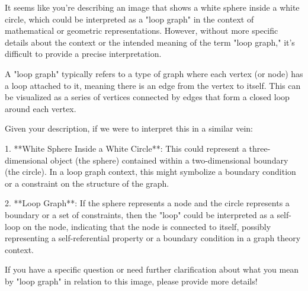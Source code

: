 It seems like you're describing an image that shows a white sphere inside a white circle, which could be interpreted as a "loop graph" in the context of mathematical or geometric representations. However, without more specific details about the context or the intended meaning of the term "loop graph," it's difficult to provide a precise interpretation.

A "loop graph" typically refers to a type of graph where each vertex (or node) has a loop attached to it, meaning there is an edge from the vertex to itself. This can be visualized as a series of vertices connected by edges that form a closed loop around each vertex.

Given your description, if we were to interpret this in a similar vein:

1. **White Sphere Inside a White Circle**: This could represent a three-dimensional object (the sphere) contained within a two-dimensional boundary (the circle). In a loop graph context, this might symbolize a boundary condition or a constraint on the structure of the graph.

2. **Loop Graph**: If the sphere represents a node and the circle represents a boundary or a set of constraints, then the "loop" could be interpreted as a self-loop on the node, indicating that the node is connected to itself, possibly representing a self-referential property or a boundary condition in a graph theory context.

If you have a specific question or need further clarification about what you mean by "loop graph" in relation to this image, please provide more details!